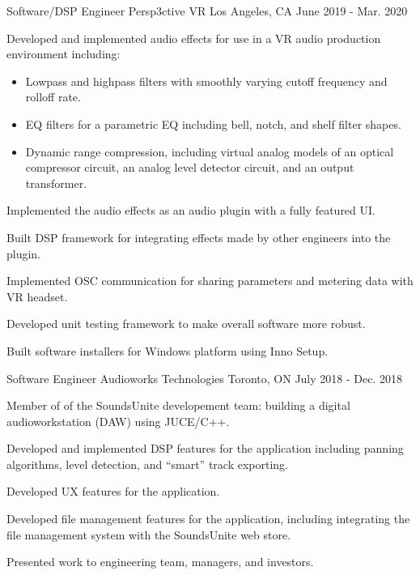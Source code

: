 \begin{cventries}
  \cventry
    {Software/DSP Engineer} %
    {Persp3ctive VR} %
    {Los Angeles, CA} %
    {June 2019 - Mar. 2020} %
    {
      \begin{cvitems} %
        \item {Developed and implemented audio effects for use in a VR audio production environment including:}
        \begin{itemize}
            \item {Lowpass and highpass filters with smoothly varying cutoff frequency and rolloff rate.}
            \item {EQ filters for a parametric EQ including bell, notch, and shelf filter shapes.}
            \item {Dynamic range compression, including virtual analog models of
                   an optical compressor circuit, an analog level detector circuit,
                   and an output transformer.}
        \end{itemize}
        \item {Implemented the audio effects as an audio plugin with a fully featured UI.}
        \item {Built DSP framework for integrating effects made by other engineers into the plugin.}
        \item {Implemented OSC communication for sharing parameters and metering data with VR headset.}
        \item {Developed unit testing framework to make overall software more robust.}
        \item {Built software installers for Windows platform using Inno Setup.}
      \end{cvitems}
    }

  \cventry
    {Software Engineer} %
    {Audioworks Technologies} %
    {Toronto, ON} %
    {July 2018 - Dec. 2018} %
    {
      \begin{cvitems} %
        \item {Member of of the SoundsUnite developement team: building a digital audioworkstation (DAW) using JUCE/C++.}
        \item {Developed and implemented DSP features for the application including panning algorithms, level detection, and ``smart'' track exporting.}
        \item {Developed UX features for the application.}
        \item {Developed file management features for the application, including integrating the file management system with the SoundsUnite web store.}
        \item {Presented work to engineering team, managers, and investors.}
      \end{cvitems}
    }


\end{cventries}
